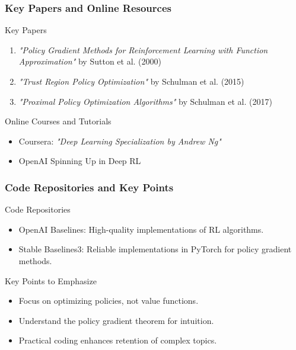 \documentclass[aspectratio=169]{beamer}
\begin{document}
\begin{frame}[fragile]
    \frametitle{Key Papers and Online Resources}
    \begin{block}{Key Papers}
        \begin{enumerate}
            \item \textit{"Policy Gradient Methods for Reinforcement Learning with Function Approximation"} by Sutton et al. (2000)
            \item \textit{"Trust Region Policy Optimization"} by Schulman et al. (2015)
            \item \textit{"Proximal Policy Optimization Algorithms"} by Schulman et al. (2017)
        \end{enumerate}
    \end{block}

    \begin{block}{Online Courses and Tutorials}
        \begin{itemize}
            \item Coursera: \textit{"Deep Learning Specialization by Andrew Ng"}
            \item OpenAI Spinning Up in Deep RL
        \end{itemize}
    \end{block}
\end{frame}

\begin{frame}[fragile]
    \frametitle{Code Repositories and Key Points}
    \begin{block}{Code Repositories}
        \begin{itemize}
            \item OpenAI Baselines: High-quality implementations of RL algorithms.
            \item Stable Baselines3: Reliable implementations in PyTorch for policy gradient methods.
        \end{itemize}
    \end{block}

    \begin{block}{Key Points to Emphasize}
        \begin{itemize}
            \item Focus on optimizing policies, not value functions.
            \item Understand the policy gradient theorem for intuition.
            \item Practical coding enhances retention of complex topics.
        \end{itemize}
    \end{block}
\end{frame}
\end{document}
